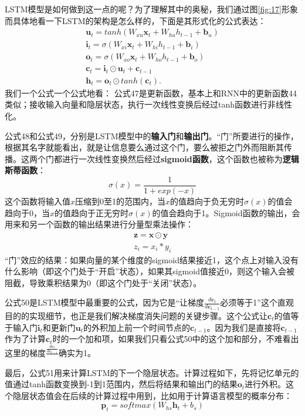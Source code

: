 \documentclass[10pt,a4paper]{ctexart}
\begin{document}
LSTM模型是如何做到这一点的呢？为了理解其中的奥秘，我们通过图\ref{fig:17}形象而具体地看一下LSTM的架构是怎么样的，下面是其形式化的公式表达：
\[
 \begin{array}{l}
 \textbf{u}_t = tanh(W_{xu}\textbf{x}_t + W_{hu}h_{t-1} + \textbf{b}_u) \\
 \textbf{i}_t = \sigma (W_{xi}\textbf{x}_t + W_{hi}h_{t-1} + \textbf{b}_i) \\
 \textbf{o}_t = \sigma (W_{xo}\textbf{x}_t + W_{ho}h_{t-1} + \textbf{b}_o) \\
 \textbf{c}_t = \textbf{i}_t \odot \textbf{u}_t + \textbf{c}_{t-1} \\
 \textbf{h}_t = \textbf{o}_t \odot tanh(\textbf{c}_t).
 \end{array}
\]
我们一个公式一个公式地看：
公式47是更新函数，基本上和RNN中的更新函数44类似；接收输入向量和隐层状态，执行一次线性变换后经过tanh函数进行非线性化。

公式48和公式49，分别是LSTM模型中的\textbf{输入门}和\textbf{输出门}。“门”所要进行的操作，根据其名字就能看出，就是让信息要么通过这个门，要么被拒之门外而阻断其传播。这两个门都进行一次线性变换然后经过\textbf{sigmoid函数}，这个函数也被称为\textbf{逻辑斯蒂函数}：
\[
 \sigma (x) = \frac{1}{1 + exp(-x)}
\]
这个函数将输入值$x$压缩到0至1的范围内，当$x$的值趋向于负无穷时$\sigma(x)$的值会趋向于0，当$x$的值趋向于正无穷时$\sigma(x)$的值会趋向于1。Sigmoid函数的输出，会用来和另一个函数的输出结果进行分量型乘法操作：
\[
 \begin{array}{l}
 \textbf{z} = \textbf{x} \odot \textbf{y} \\
 z_i = x_i * y_i
 \end{array}
\]
“门”效应的结果：如果向量的某个维度的sigmoid结果接近1，这个点上对输入没有什么影响（即这个门处于“开启”状态），如果其sigmoid值接近0，则这个输入会被阻截，导致乘积结果为0（即这个门处于“关闭”状态）。

公式50是LSTM模型中最重要的公式，因为它是“让梯度$\frac{d\textbf{c}_t}{d\textbf{c}_{t-1}}$必须等于1”这个直观目的的实现细节，也正是我们解决梯度消失问题的关键步骤。这个公式让$\textbf{c}_t$的值等于输入门$\textbf{i}_t$和更新门$\textbf{u}_t$的外积加上前一个时间节点的$\textbf{c}_{t-1}$。因为我们是直接将$\textbf{c}_{t-1}$作为了计算$\textbf{c}_t$时的一个加和项，如果我们只看公式50中的这个加和部分，不难看出这里的梯度$\frac{\frac{d\textbf{c}_t}{d\textbf{c}_{t-1}}}{}$确实为1。

最后，公式51用来计算LSTM的下一个隐层状态。计算过程如下，先将记忆单元的值通过tanh函数变换到-1到1范围内，然后将结果和输出门的结果$\textbf{o}_t$进行外积。这个隐层状态值会在后续的计算过程中用到，比如用于计算语言模型的概率分布：
\[
 \textbf{p}_t = softmax(W_{hs}\textbf{h}_t + b_s)
\]
\end{document}
